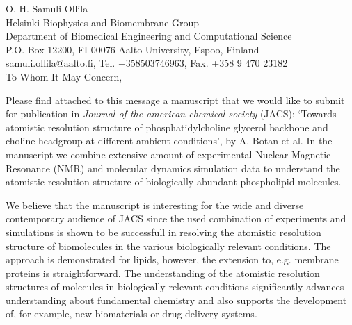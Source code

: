 \documentclass[12pt]{letter}
\begin{document}
\reversemarginpar
\pagestyle{empty}
\noindent O. H. Samuli Ollila \\
\noindent Helsinki Biophysics and Biomembrane Group\\
\noindent Department of Biomedical Engineering and Computational Science\\
\noindent P.O. Box 12200, FI-00076 Aalto University, Espoo, Finland\\
\noindent samuli.ollila@aalto.fi, Tel. +358503746963, Fax. +358 9 470 23182 \\


%
%

To Whom It May Concern,

Please find attached to this message a manuscript that we would like to submit for publication 
in \textit{Journal of the american chemical society} (JACS): 
`Towards atomistic resolution structure of phosphatidylcholine glycerol backbone and choline headgroup at different ambient conditions', 
by A. Botan et al. In the manuscript we combine extensive amount of experimental Nuclear Magnetic Resonance (NMR)
and molecular dynamics simulation data to understand the atomistic resolution structure of biologically abundant phospholipid molecules.

We believe that the manuscript is interesting for the wide and diverse contemporary audience of
JACS since the used combination of experiments and simulations is shown to be successfull in
resolving the atomistic resolution structure of biomolecules in the various biologically relevant conditions.
The approach is demonstrated for lipids, however, the extension to, e.g. membrane proteins is straightforward. 
The understanding of the atomistic resolution structures of molecules in biologically relevant conditions 
significantly advances understanding about fundamental chemistry and also supports the development of, 
for example, new biomaterials or drug delivery systems.
\end{document}
